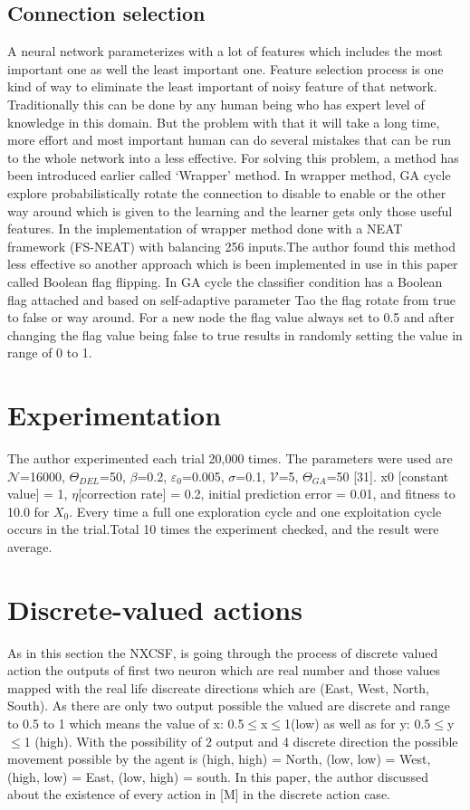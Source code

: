 \documentclass[12pt]{article}
\begin{document}
\subsection{Connection selection }
\label{sec:2}
A neural network parameterizes with a lot of features which includes the most important one as well the least important one. Feature selection process is one kind of way to eliminate the least important of noisy feature of that network. Traditionally this can be done by any human being who has expert level of knowledge in this domain. But the problem with that it will take a long time, more effort and most important human can do several mistakes that can be run to the whole network into a less effective. For solving this problem, a method has been introduced earlier called ‘Wrapper’ method.  In wrapper method, GA cycle explore probabilistically rotate the connection to disable to enable or the other way around which is given to the learning and the learner gets only those useful features. In \cite{10.1145/1068009.1068210} the implementation of wrapper method done with a NEAT framework (FS-NEAT) with balancing 256 inputs.The author found this method less effective so another approach which is been implemented in \cite{10.1145/1388969.1389010} use in this paper called Boolean flag flipping. In GA cycle the classifier condition has a Boolean flag attached and based on self-adaptive parameter Tao the flag rotate from true to false or way around. For a new node the flag value always set to 0.5 and after changing the flag value being false to true results in randomly setting the value in range of 0 to 1. 


\section{Experimentation}
\label{sec:verify}
The author experimented each trial 20,000 times. The parameters were used are $\mathcal{N}$=16000, $\varTheta  _{DEL} $=50, $\beta$=0.2, $\varepsilon _{0}$=0.005, $\sigma $=0.1, $\mathcal{V}$=5, $\varTheta  _{GA} $=50 [31]. x0 [constant value] = 1, $\eta$[correction rate]  = 0.2, initial prediction error  = 0.01, and fitness to 10.0 for $X_0$. Every time a full one exploration cycle and one exploitation cycle occurs in the trial.Total 10 times the experiment checked, and the result were average. 
\section{Discrete-valued actions}
\label{sec:verify}
As in this section the NXCSF, is going through the process of discrete valued action the outputs of first two neuron which are real number and those values mapped with the real life discreate directions which are (East, West, North, South). As there are only two output possible the valued are discrete and range to 0.5 to 1 which means the value of x: 0.5$\leq$x$\leq$1(low) as well as for y: 0.5$\leq$y$\leq$1 (high). With the possibility of 2 output and 4 discrete direction the possible movement possible by the agent is (high, high) = North, (low, low) = West, (high, low) = East, (low, high) = south. In this paper, the author discussed about the existence of every action in [M] in the discrete action case. 
\end{document}
